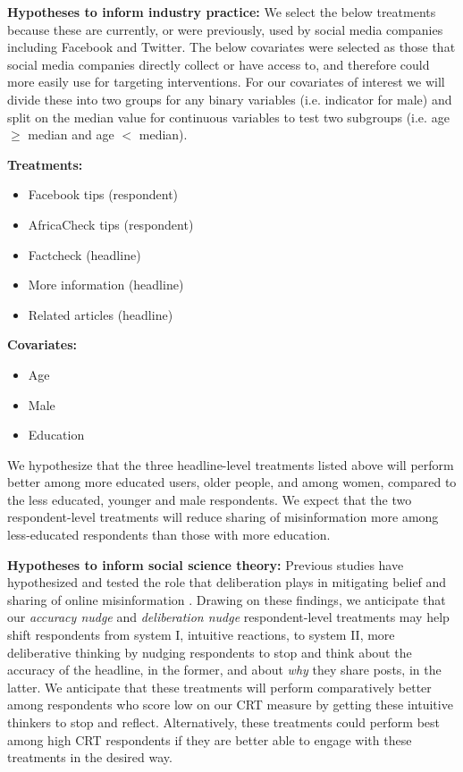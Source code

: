 \documentclass[letterpaper, 12pt, parskip=full,DIV=10]{scrartcl}
\begin{document}
\textbf{Hypotheses to inform industry practice:}
We select the below treatments because these are currently, or were previously, used by social media companies including Facebook and Twitter. The below covariates were selected as those that social media companies directly collect or have access to, and therefore could more easily use for targeting interventions. For our covariates of interest we will divide these into two groups for any binary variables (i.e. indicator for male) and split on the median value for continuous variables to test two subgroups (i.e. age $\geq$ median and age $<$ median). 

\textbf{Treatments:}
\begin{itemize}
\item Facebook tips (respondent)
\item AfricaCheck tips (respondent)
\item Factcheck (headline)
\item More information (headline)
\item Related articles (headline)
\end{itemize}

\textbf{Covariates:}
\begin{itemize}
\item Age
\item Male
\item Education
\end{itemize}

We hypothesize that the three headline-level treatments listed above will perform better among more educated users, older people, and among women, compared to the less educated, younger and male respondents. We expect that the two respondent-level treatments will reduce sharing of misinformation more among less-educated respondents than those with more education. %

\textbf{Hypotheses to inform social science theory:} Previous studies have hypothesized and tested the role that deliberation plays in mitigating belief and sharing of online misinformation \citep{bago2020fake,pennycook2020fighting}. Drawing on these findings, we anticipate that our \textit{accuracy nudge} and \textit{deliberation nudge} respondent-level treatments may help shift respondents from system I, intuitive reactions, to system II, more deliberative thinking by nudging respondents to stop and think about the accuracy of the headline, in the former, and about \textit{why} they share posts, in the latter. We anticipate that these treatments will perform comparatively better among respondents who score low on our CRT measure by getting these intuitive thinkers to stop and reflect. Alternatively, these treatments could perform best among high CRT respondents if they are better able to engage with these treatments in the desired way. 
\end{document}
